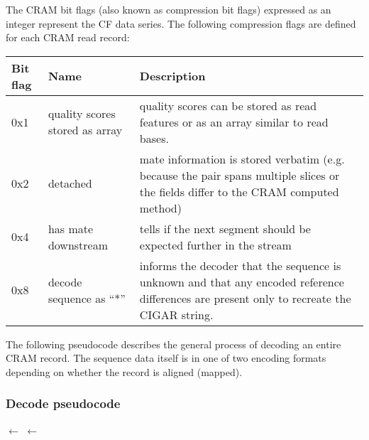 \documentclass[a4paper]{article}
\begin{document}
The CRAM bit flags (also known as compression bit flags) expressed as an integer represent the CF data series. 
The following compression flags are defined for each CRAM read record:

\begin{tabular}{|>{\raggedright}p{39pt}|>{\raggedright}p{150pt}|>{\raggedright}p{242pt}|}
\hline
\textbf{Bit flag} & \textbf{Name} & \textbf{Description}\tabularnewline
\hline
0x1 & quality scores stored as array & quality scores can be stored as read features
or as an array similar to read bases.\tabularnewline
\hline
0x2 & detached & mate information is stored verbatim (e.g. because the pair spans multiple slices or the fields differ to the CRAM computed method)\tabularnewline
\hline
0x4 & has mate downstream & tells if the next segment should be expected further
in the stream\tabularnewline
\hline
0x8 & decode sequence as ``*'' & informs the decoder that the sequence
is unknown and that any encoded reference differences are present only to
recreate the CIGAR string.\tabularnewline
\hline
\end{tabular}


The following pseudocode describes the general process of decoding an entire CRAM record.
The sequence data itself is in one of two encoding formats depending on whether the record is aligned (mapped).

\subsubsection*{\textbf{Decode pseudocode}}
\newlength{\maxwidth}
\newcommand{\algalign}[2] %
{\makebox[\maxwidth][l]{$#1{}$}${}#2$}

\begin{algorithmic}[1]
\settowidth{\maxwidth}{CRAM\_flags\quad}
\State \algalign{BAM\_flags}{\gets}  
\State \algalign{CRAM\_flags}{\gets} 
\State {}
\State {}
\State {}
\State {}
\Statex

  \State {}
\Else
  \State {}
\EndIf
\EndProcedure
\end{algorithmic}
\end{document}
